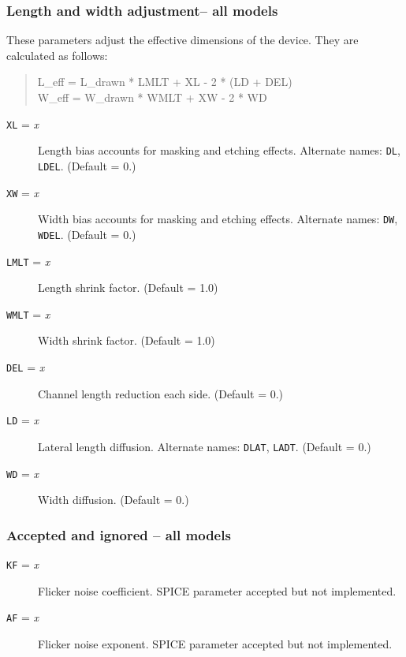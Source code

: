 \subsubsection{Length and width adjustment-- all models}

These parameters adjust the effective dimensions of the device.  They
are calculated as follows:

\begin{verse}
L\_eff = L\_drawn * LMLT + XL - 2 * (LD + DEL) \\
W\_eff = W\_drawn * WMLT + XW - 2 * WD
\end{verse}

\begin{description}

\item[{\tt XL} = {\it x}]
Length bias accounts for masking and etching effects.
Alternate names: {\tt DL}, {\tt LDEL}.
(Default = 0.)

\item[{\tt XW} = {\it x}]
Width bias accounts for masking and etching effects.
Alternate names: {\tt DW}, {\tt WDEL}.
(Default = 0.)

\item[{\tt LMLT} = {\it x}]
Length shrink factor. (Default = 1.0)

\item[{\tt WMLT} = {\it x}]
Width shrink factor. (Default = 1.0)

\item[{\tt DEL} = {\it x}]
Channel length reduction each side. (Default = 0.)

\item[{\tt LD} = {\it x}]
Lateral length diffusion.
Alternate names: {\tt DLAT}, {\tt LADT}.
(Default = 0.)

\item[{\tt WD} = {\it x}]
Width diffusion.  (Default = 0.)

\end{description}
\subsubsection{Accepted and ignored -- all models}
\begin{description}

\item[{\tt KF} = {\it x}]
Flicker noise coefficient.  SPICE parameter accepted but not
implemented.

\item[{\tt AF} = {\it x}]
Flicker noise exponent.  SPICE parameter accepted but not implemented.

\end{description}

